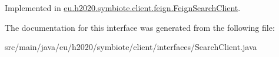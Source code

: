 Implemented in \hyperlink{classeu_1_1h2020_1_1symbiote_1_1client_1_1feign_1_1FeignSearchClient_ae3379566327dc89bae6fb25cfafc68da}{eu.\+h2020.\+symbiote.\+client.\+feign.\+Feign\+Search\+Client}.



The documentation for this interface was generated from the following file\+:\begin{DoxyCompactItemize}
\item 
src/main/java/eu/h2020/symbiote/client/interfaces/Search\+Client.\+java\end{DoxyCompactItemize}
